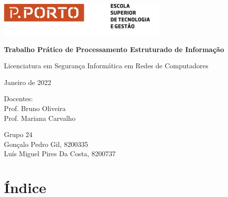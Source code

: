 \documentclass{article}
\begin{document}
\begin{titlepage}
    \begin{center}
    
        \begin{center}
            \includegraphics[scale=4]{Images/logo-ipp.png}
        \end{center}
    
        \vspace*{6cm}
        
        \LARGE   
        \textbf{Trabalho Prático de Processamento Estruturado de Informação}
            
        \vspace{0.5cm}
        
        Licenciatura em Segurança Informática em Redes de Computadores
        
        \vspace{0.5cm}
        
        \large  
        Janeiro de 2022\\
        
        \vspace{0.5cm} 
        
        \large
        Docentes: \\
        Prof. Bruno Oliveira \\
        Prof. Mariana Carvalho\\
        \vfill
        \vspace{0.8cm}
            
        \large
        Grupo 24     \\
        Gonçalo Pedro Gil, 8200335\\
        Luís Miguel Pires Da Costa, 8200737\\
    \end{center}
\end{titlepage}

\newpage
\section{Índice}
\end{document}
